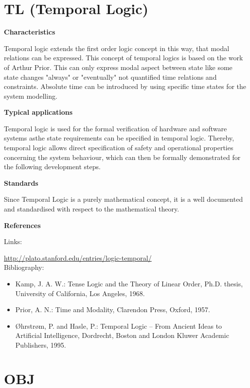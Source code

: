 \documentclass{./template/openetcs_report}
\begin{document}
\section{TL (Temporal Logic)}


	\textbf{Characteristics}


Temporal logic extends the first order logic concept in this way, that modal relations can be expressed. This concept of temporal logics is based on the work of Arthur Prior. This can only express modal aspect between state like some state changes "always" or "eventually" not quantified time relations and constraints. Absolute time can be introduced by using specific time states for the system modelling.

	\textbf{Typical applications}

Temporal logic is used for the formal verification of hardware and software systems asthe state requirements can be specified in temporal logic. Thereby, temporal logic allows direct specification of safety and operational properties concerning the system behaviour, which can then be formally demonstrated for the following development steps.

	\textbf{Standards}

Since Temporal Logic is a purely mathematical concept, it is a well documented and standardised with respect to the mathematical theory.


	\textbf{References}

Links:

\url{http://plato.stanford.edu/entries/logic-temporal/} \\[4pt]

Bibliography:

\begin{itemize}
\item Kamp, J. A. W.: Tense Logic and the Theory of Linear Order, Ph.D. thesis, University of California, Los Angeles, 1968.
\item Prior, A. N.: Time and Modality, Clarendon Press, Oxford, 1957.
\item Øhrstrøm, P. and Hasle, P.: Temporal Logic -- From Ancient Ideas to Artificial Intelligence, Dordrecht, Boston and London Kluwer Academic Publishers, 1995.
\end{itemize}




\section{OBJ}
\end{document}
